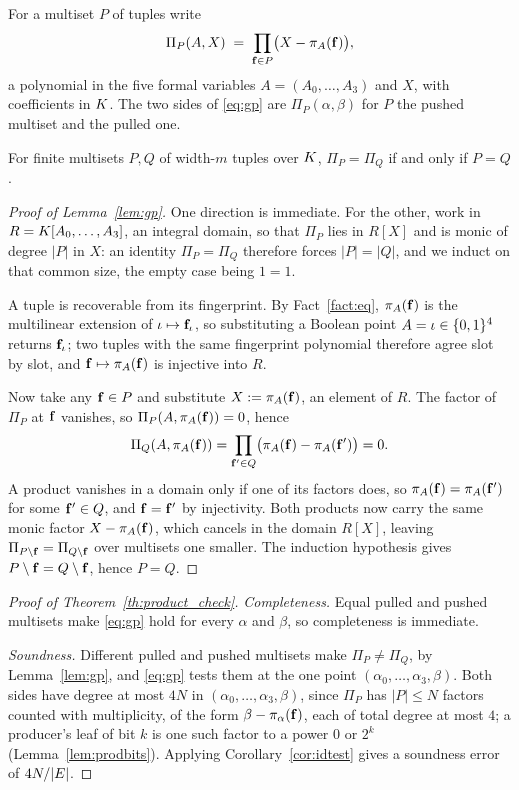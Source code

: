 \begin{lemma}\label{lem:gp}
For a multiset $P$ of tuples write
\[
  \Pi_P(A,X)\;=\;\prod_{\mathbf{f}\in P}\bigl(X-\pi_A(\mathbf{f})\bigr),
\]
a polynomial in the five formal variables $A=(A_0,\dots,A_3)$ and $X$, with coefficients in $K$. The two sides of \eqref{eq:gp} are $\Pi_P(\alpha,\beta)$ for $P$ the pushed multiset and the pulled one.

For finite multisets $P,Q$ of width-$m$ tuples over $K$, $\Pi_P=\Pi_Q$ if and only if $P=Q$.
\end{lemma}

\begin{proof}[Proof of Lemma~\ref{lem:gp}]
One direction is immediate. For the other, work in $R=K[A_0,\dots,A_3]$, an integral domain, so that $\Pi_P$ lies in $R[X]$ and is monic of degree $|P|$ in $X$: an identity $\Pi_P=\Pi_Q$ therefore forces $|P|=|Q|$, and we induct on that common size, the empty case being $1=1$.

A tuple is recoverable from its fingerprint. By Fact~\ref{fact:eq}, $\pi_A(\mathbf{f})$ is the multilinear extension of $\iota\mapsto\mathbf{f}_\iota$, so substituting a Boolean point $A=\iota\in\{0,1\}^{4}$ returns $\mathbf{f}_\iota$; two tuples with the same fingerprint polynomial therefore agree slot by slot, and $\mathbf{f}\mapsto\pi_A(\mathbf{f})$ is injective into $R$.

Now take any $\mathbf{f}\in P$ and substitute $X:=\pi_A(\mathbf{f})$, an element of $R$. The factor of $\Pi_P$ at $\mathbf{f}$ vanishes, so $\Pi_P(A,\pi_A(\mathbf{f}))=0$, hence
\[
  \Pi_Q(A,\pi_A(\mathbf{f}))=\prod_{\mathbf{f}'\in Q}\bigl(\pi_A(\mathbf{f})-\pi_A(\mathbf{f}')\bigr)=0 .
\]
A product vanishes in a domain only if one of its factors does, so $\pi_A(\mathbf{f})=\pi_A(\mathbf{f}')$ for some $\mathbf{f}'\in Q$, and $\mathbf{f}=\mathbf{f}'$ by injectivity. Both products now carry the same monic factor $X-\pi_A(\mathbf{f})$, which cancels in the domain $R[X]$, leaving $\Pi_{P\setminus\mathbf{f}}=\Pi_{Q\setminus\mathbf{f}}$ over multisets one smaller. The induction hypothesis gives $P\setminus\mathbf{f}=Q\setminus\mathbf{f}$, hence $P=Q$.
\end{proof}


\begin{proof}[Proof of Theorem~\ref{th:product_check}]
\emph{Completeness.} Equal pulled and pushed multisets make \eqref{eq:gp} hold for every $\alpha$ and $\beta$, so completeness is immediate.

\emph{Soundness.} Different pulled and pushed multisets make $\Pi_P\neq\Pi_Q$, by Lemma~\ref{lem:gp}, and \eqref{eq:gp} tests them at the one point $(\alpha_0, \dots, \alpha_3, \beta)$. Both sides have degree at most $4N$ in $(\alpha_0, \dots, \alpha_3, \beta)$, since $\Pi_P$ has $|P|\le N$ factors counted with multiplicity, of the form $\beta-\pi_\alpha(\mathbf{f})$, each of total degree at most $4$; a producer's leaf of bit $k$ is one such factor to a power $0$ or $2^{k}$ (Lemma~\ref{lem:prodbits}). Applying Corollary~\ref{cor:idtest} gives a soundness error of $4N/|E|$.
\end{proof}

